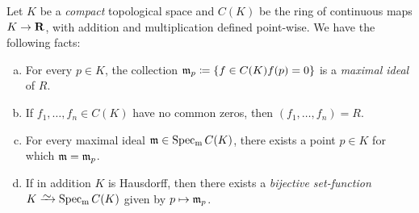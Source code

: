 \begin{example}
\label{exp:bijection-compact-specm}
Let \(K\) be a \emph{compact} topological space and \(C(K)\) be the ring of
continuous maps \(K \to \mathbf{R}\), with addition and multiplication defined
point-wise. We have the following facts:
\begin{enumerate}[(a)]\setlength\itemsep{0em}
\item For every \(p \in K\), the collection
  \(\mathfrak{m}_p \coloneq \{f \in C(K) \relax f(p) = 0\}\) is a \emph{maximal
    ideal} of \(R\).

\item If \(f_1, \dots, f_n \in C(K)\) have no common zeros, then
  \((f_1, \dots, f_n) = R\).

\item For every maximal ideal \(\mathfrak{m} \in \operatorname{Spec_m} C(K)\), there exists a
  point \(p \in K\) for which \(\mathfrak{m} = \mathfrak{m}_p\).

\item If in addition \(K\) is Hausdorff, then there exists a \emph{bijective
    set-function} \(K \isoto \Specm C(K)\) given by \(p \mapsto \mathfrak{m}_p\).
\end{enumerate}
\end{example}

